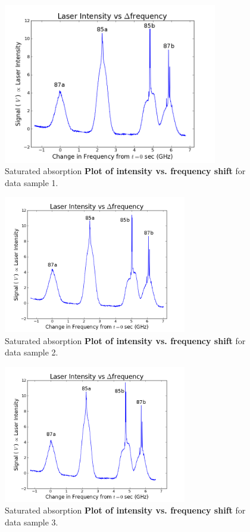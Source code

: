 \documentclass[paper=a4, fontsize=11pt]{scrartcl} %
\numberwithin{equation}{section}
\numberwithin{figure}{section}
\numberwithin{table}{section}
\begin{document}
\begin{figure}[h] \begin{center}
  \includegraphics[height=70mm]{4-2-009.png}
  \caption{Saturated absorption \textbf{Plot of intensity vs. frequency shift} for data sample 1. }
  \label{fig:scaled_1}
\end{center} \end{figure}

\begin{figure}[h] \begin{center}
  \includegraphics[height=60mm]{4-2-010.png}
  \caption{Saturated absorption \textbf{Plot of intensity vs. frequency shift} for data sample 2. }
  \label{fig:scaled_2}
\end{center} \end{figure}

\begin{figure}[h] \begin{center}
  \includegraphics[height=60mm]{4-2-011.png}
  \caption{Saturated absorption \textbf{Plot of intensity vs. frequency shift} for data sample 3. }
  \label{fig:scaled_3}
\end{center} \end{figure}
\end{document}
